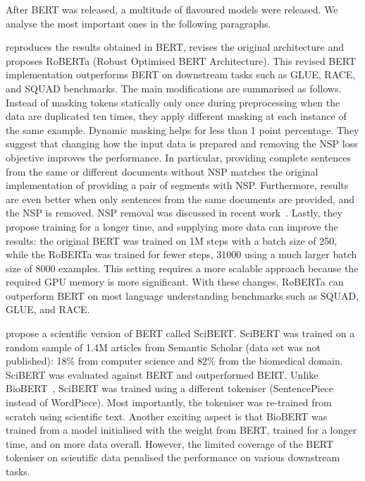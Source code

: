 After BERT was released, a multitude of flavoured models were released. We analyse the most important ones in the following paragraphs. 

\cite{liu2019roberta} reproduces the results obtained in BERT, revises the original architecture and proposes RoBERTa (Robust Optimised BERT Architecture). This revised BERT implementation outperforms BERT on downstream tasks such as GLUE, RACE, and SQUAD benchmarks. 
The main modifications are summarised as follows. Instead of masking tokens statically only once during preprocessing when the data are duplicated ten times, they apply different masking at each instance of the same example. Dynamic masking helps for less than 1 point percentage.
They suggest that changing how the input data is prepared and removing the NSP loss objective improves the performance. 
In particular, providing complete sentences from the same or different documents without NSP matches the original implementation of providing a pair of segments with NSP. 
Furthermore, results are even better when only sentences from the same documents are provided, and the NSP is removed.
NSP removal was discussed in recent work~\cite{lample2019cross}.
Lastly, they propose training for a longer time, and supplying more data can improve the results: the original BERT was trained on 1M steps with a batch size of 250, while the RoBERTa was trained for fewer steps, 31000 using a much larger batch size of 8000 examples. This setting requires a more scalable approach because the required GPU memory is more significant. 
With these changes, RoBERTa can outperform BERT on most language understanding benchmarks such as SQUAD, GLUE, and RACE. 

\cite{Beltagy2019SciBERT} propose a scientific version of BERT called SciBERT. 
SciBERT was trained on a random sample of 1.4M articles from Semantic Scholar (data set was not published): 18\% from computer science and 82\% from the biomedical domain. SciBERT was evaluated against BERT and outperformed BERT. 
Unlike BioBERT~\cite{lee2019biobert}, SciBERT was trained using a different tokeniser (SentencePiece instead of WordPiece). Most importantly, the tokeniser was re-trained from scratch using scientific text.
Another exciting aspect is that BioBERT was trained from a model initialised with the weight from BERT, trained for a longer time, and on more data overall. However, the limited coverage of the BERT tokeniser on scientific data penalised the performance on various downstream tasks.

